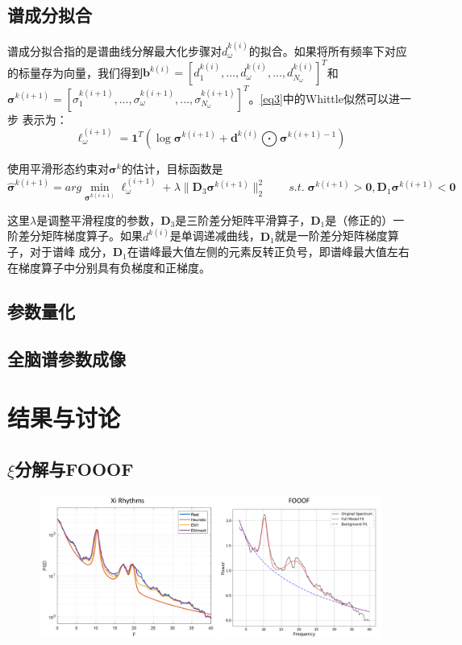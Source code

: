 \subsection{谱成分拟合}
谱成分拟合指的是谱曲线分解最大化步骤对$d_\omega^{k(i)}$的拟合。如果将所有频率下对应的标量存为向量，我们得到$\mathbf{b}^{k(i)}=[d_1^{k(i)},...,d_\omega^{k(i)},...,d_{N_\omega}^{k(i)}]^T$和$\mathbf{\sigma}^{k(i+1)}=[\sigma_1^{k(i+1)},...,\sigma_\omega^{k(i+1)},...,\sigma_{N_\omega}^{k(i+1)}]^T$。\eqref{eq3}中的Whittle似然可以进一步
表示为：
\begin{equation}\label{eq11}
\ell_\omega^{(i+1)}=\mathbf{1}^T(\log{\mathbf{\sigma}}^{k(i+1)}+\mathbf{d}^{k(i)}\bigodot{\mathbf{\sigma}^{k(i+1)-1}})
\end{equation}

使用平滑形态约束对$\mathbf{\sigma}^k$的估计，目标函数是
\begin{equation}\label{eq12}
\hat{\mathbf{\sigma}}^{k(i+1)}=arg\min_{\mathbf{\sigma}^{k(i+1)}}\ell_\omega^{(i+1)}+\lambda\lVert\mathbf{D}_3\mathbf{\sigma}^{k(i+1)}\rVert_2^2\qquad
s.t.\;\mathbf{\sigma}^{k(i+1)}>\mathbf{0},\mathbf{D}_1\mathbf{\sigma}^{k(i+1)}<\mathbf{0}
\end{equation}

这里$\lambda$是调整平滑程度的参数，$\mathbf{D}_3$是三阶差分矩阵平滑算子，$\mathbf{D}_1$是（修正的）一阶差分矩阵梯度算子。如果$d^{k(i)}$是单调递减曲线，$\mathbf{D}_1$就是一阶差分矩阵梯度算子，对于谱峰
成分，$\mathbf{D}_1$在谱峰最大值左侧的元素反转正负号，即谱峰最大值左右在梯度算子中分别具有负梯度和正梯度。

\subsection{参数量化}

\subsection{全脑谱参数成像}

\section{结果与讨论}
\subsection{$\xi$分解与FOOOF}
\begin{figure}[!ht]
	\includegraphics[width=15cm]{pic/xipi/figure3.png}
	\caption{}
	\label{fig3}
\end{figure}

